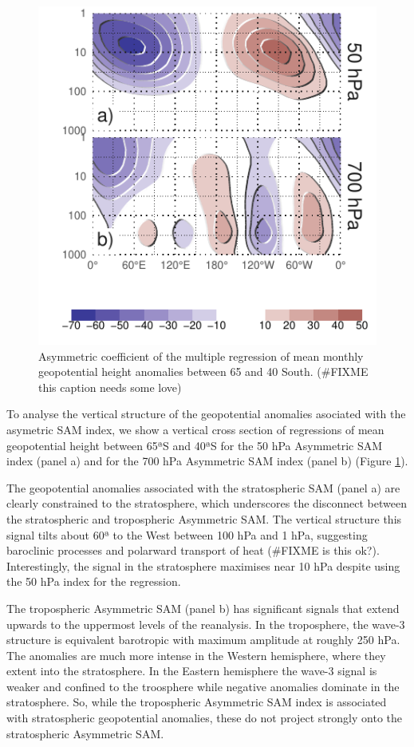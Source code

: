 \documentclass[]{ametsocV5}
\begin{document}
\begin{figure}
\includegraphics{vertical-regression-1} \caption[Asymmetric coefficient of the multiple regression of mean monthly geopotential height anomalies between 65 and 40 South]{Asymmetric coefficient of the multiple regression of mean monthly geopotential height anomalies between 65 and 40 South. (\#FIXME this caption needs some love)}\label{fig:vertical-regression}
\end{figure}

To analyse the vertical structure of the geopotential anomalies
asociated with the asymetric SAM index, we show a vertical cross section
of regressions of mean geopotential height between 65ªS and 40ªS for the
50 hPa Asymmetric SAM index (panel a) and for the 700 hPa Asymmetric SAM
index (panel b) (Figure \ref{fig:vertical-regression}).

The geopotential anomalies associated with the stratospheric SAM (panel
a) are clearly constrained to the stratosphere, which underscores the
disconnect between the stratospheric and tropospheric Asymmetric SAM.
The vertical structure this signal tilts about 60ª to the West between
100 hPa and 1 hPa, suggesting baroclinic processes and polarward
transport of heat (\#FIXME is this ok?). Interestingly, the signal in
the stratosphere maximises near 10 hPa despite using the 50 hPa index
for the regression.

The tropospheric Asymmetric SAM (panel b) has significant signals that
extend upwards to the uppermost levels of the reanalysis. In the
troposphere, the wave-3 structure is equivalent barotropic with maximum
amplitude at roughly 250 hPa. The anomalies are much more intense in the
Western hemisphere, where they extent into the stratosphere. In the
Eastern hemisphere the wave-3 signal is weaker and confined to the
troosphere while negative anomalies dominate in the stratosphere. So,
while the tropospheric Asymmetric SAM index is associated with
stratospheric geopotential anomalies, these do not project strongly onto
the stratospheric Asymmetric SAM.
\end{document}
